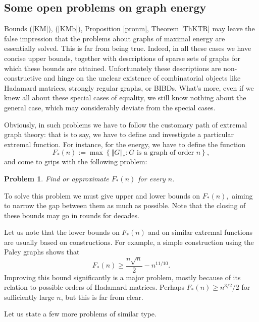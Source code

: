\documentclass[12pt]{article}%
\newtheorem{problem}[theorem]{Problem}
\begin{document}
\medskip

\subsection{\label{OPtr}Some open problems on graph energy}

Bounds (\ref{KM}), (\ref{KMb}), Proposition \ref{pronm}, Theorem \ref{ThKTR}
may leave the false impression that the problems about graphs of maximal
energy are essentially solved. This is far from being true. Indeed, in all
these cases we have concise upper bounds, together with descriptions of sparse
sets of graphs for which these bounds are attained. Unfortunately these
descriptions are non-constructive and hinge on the unclear existence of
combinatorial objects like Hadamard matrices, strongly regular graphs, or
BIBDs. What's more, even if we knew all about these special cases of equality,
we still know nothing about the general case, which may considerably deviate
from the special cases.

Obviously, in such problems we have to follow the customary path of extremal
graph theory: that is to say, we have to define and investigate a particular
extremal function. For instance, for the energy, we have to define the
function%
\[
F_{\ast}\left(  n\right)  :=\max\left\{  \left\Vert G\right\Vert _{\ast
}:G\text{ is a graph of order }n\right\}  ,
\]
and come to grips with the following problem:

\begin{problem}
Find or approximate $F_{\ast}\left(  n\right)  $ for every $n.$
\end{problem}

To solve this problem we must give upper and lower bounds on $F_{\ast}\left(
n\right)  ,$ aiming to narrow the gap between them as much as possible. Note
that the closing of these bounds may go in rounds for decades.

Let us note that the lower bounds on $F_{\ast}\left(  n\right)  $ and on
similar extremal functions are usually based on constructions. For example, a
simple construction using the Paley graphs \cite{Nik07j} shows that
\[
F_{\ast}\left(  n\right)  \geq\frac{n\sqrt{n}}{2}-n^{11/10}.
\]
Improving this bound significantly is a major problem, mostly because of its
relation to possible orders of Hadamard matrices. Perhaps $F_{\ast}\left(
n\right)  \geq n^{3/2}/2$ for sufficiently large $n$, but this is far from
clear.\medskip

Let us state a few more problems of similar type.
\end{document}
